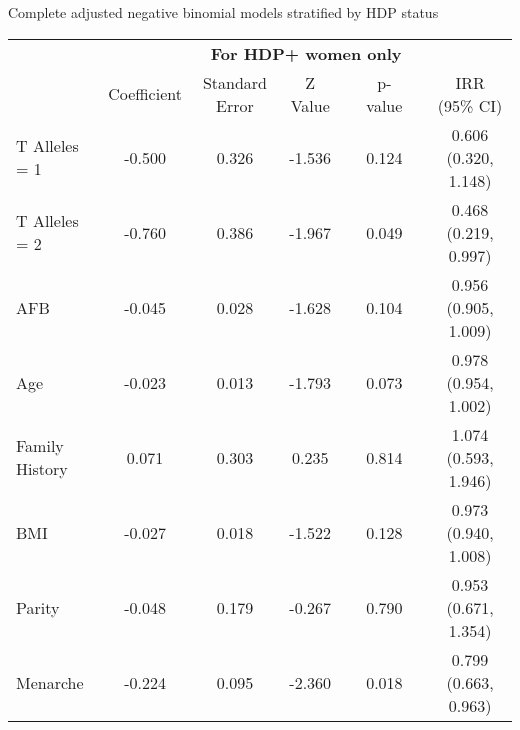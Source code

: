 \documentclass{standalone}
\begin{document}
\begin{threeparttable}
\caption{Complete adjusted negative binomial models stratified by HDP status}
\begin{tabular}{@{}lccccccc@{}}
  \toprule
  & \multicolumn{7}{c}{\textbf{For HDP+ women only}} \\
   \cmidrule{2-8}
  & Coefficient & Standard Error & Z Value & \hspace{1em} & p-value & \hspace{1em} & IRR (95\% CI) \\ 
  \midrule
  T Alleles = 1\phantom{hdpxx} & -0.500 & 0.326 & -1.536 && 0.124 && 0.606 (0.320, 1.148) \\ 
  T Alleles = 2 & -0.760 & 0.386 & -1.967 && 0.049 && 0.468 (0.219, 0.997) \\ 
  AFB & -0.045 & 0.028 & -1.628 && 0.104 && 0.956 (0.905, 1.009) \\ 
  Age & -0.023 & 0.013 & -1.793 && 0.073 && 0.978 (0.954, 1.002) \\ 
  Family History & 0.071 & 0.303 & 0.235 && 0.814 && 1.074 (0.593, 1.946) \\ 
  BMI & -0.027 & 0.018 & -1.522 && 0.128 && 0.973 (0.940, 1.008) \\ 
  Parity & -0.048 & 0.179 & -0.267 && 0.790 && 0.953 (0.671, 1.354) \\ 
  Menarche & -0.224 & 0.095 & -2.360 && 0.018 && 0.799 (0.663, 0.963) \\ 
  

\end{tabular}
\end{threeparttable}
\end{document}
